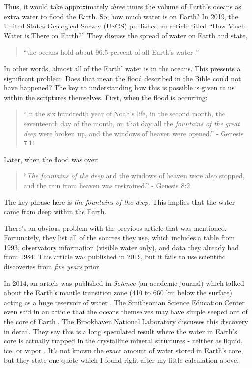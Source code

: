 \documentclass[10pt]{article}
\begin{document}
\begin{multicols}{2}
Thus, it would take approximately \textit{three} times the volume of Earth's oceans as extra water to flood the Earth. So, how much water is on Earth? In 2019, the United States Geological Survey (USGS) published an article titled ``How Much Water is There on Earth?'' They discuss the spread of water on Earth and state,
\begin{quotation}
\noindent``the oceans hold about 96.5 percent of all Earth's water \cite{ocean water}.'' 
\end{quotation}
In other words, almost all of the Earth' water is in the oceans. This presents a significant problem. Does that mean the flood described in the Bible could not have happened? The key to understanding how this is possible is given to us within the scriptures themselves. First, when the flood is occurring:
\begin{quotation}
``In the six hundredth year of Noah’s life, in the second month, the seventeenth day of the month, on that day all the \textit{fountains of the great deep} were broken up, and the windows of heaven were opened.'' - Genesis 7:11
\end{quotation}
Later, when the flood was over:
\begin{quotation}
``\textit{The fountains of the deep} and the windows of heaven were also stopped, and the rain from heaven was restrained.'' - Genesis 8:2
\end{quotation}
The key phrase here is \textit{the fountains of the deep}. This implies that the water came from deep within the Earth.

There's an obvious problem with the previous article that was mentioned. Fortunately, they list all of the sources they use, which includes a table from 1993, observatory information (visible water only), and data they already had from 1984. This article was published in 2019, but it fails to use scientific discoveries from \textit{five years} prior.

In 2014, an article was published in \textit{Science} (an academic journal) which talked about the Earth's mantle transition zone (410 to 660 km below the surface) acting as a huge reservoir of water \cite{mantle water}. The Smithsonian Science Education Center even said in an article that the oceans themselves may have simple seeped out of the core of Earth \cite{ocean below feet}. The Brookhaven National Laboratory discusses this discovery in detail. They say this is a long speculated result where the water in Earth's core is actually trapped in the crystalline mineral structures - neither as liquid, ice, or vapor \cite{deep earth water}. It's not known the exact amount of water stored in Earth's core, but they state one quote which I found right after my little calculation above.


\end{multicols}
\end{document}
